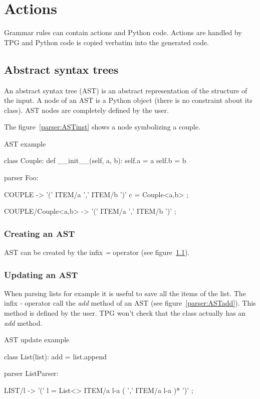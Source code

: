 \section{Actions}

Grammar rules can contain actions and Python code.
Actions are handled by TPG and Python code is copied verbatim into the generated code.

\subsection{Abstract syntax trees}
\label{parser:AST}

An abstract syntax tree (AST) is an abstract representation of the structure of the input.
A node of an AST is a Python object (there is no constraint about its class).
AST nodes are completely defined by the user.

The figure~\ref{parser:ASTinst} shows a node symbolizing a couple.

\begin{code}
\caption{AST example} \label{parser:ASTinst}
\begin{verbatimtab}[4]
{{
	class Couple:
		def __init__(self, a, b):
			self.a = a
			self.b = b
}}

parser Foo:

	COUPLE -> '(' ITEM/a ',' ITEM/b ')' c = Couple<a,b> ;

	COUPLE/Couple<a,b> -> '(' ITEM/a ',' ITEM/b ')' ;
\end{verbatimtab}
\end{code}

\subsubsection{Creating an AST}

AST can be created by the infix \emph{=} operator (see figure~\ref{parser:AST}).

\subsubsection{Updating an AST}

When parsing lists for example it is useful to save all the items of the list.
The infix \emph{-} operator call the \emph{add} method of an AST (see figure~\ref{parser:ASTadd}).
This method is defined by the user.
TPG won't check that the class actually has an \emph{add} method.

\begin{code}
\caption{AST update example} \label{parser:ASTadd}
\begin{verbatimtab}[4]
{{
	class List(list):
		add = list.append
}}

parser ListParser:

	LIST/l ->
		'('
			l = List<>
			ITEM/a l-a
			( ',' ITEM/a l-a )*
		')'
		;
\end{verbatimtab}
\end{code}

